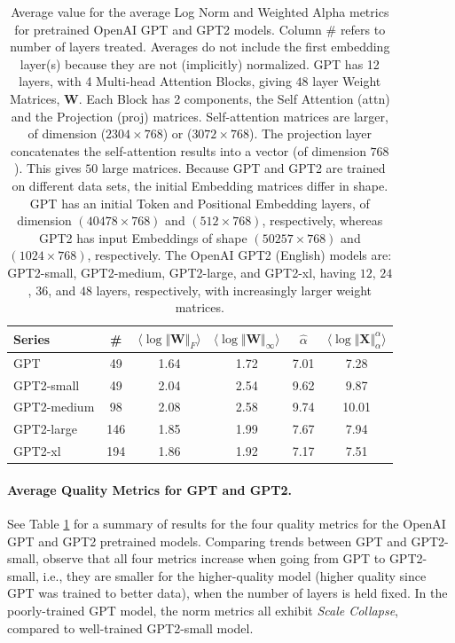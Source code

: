\begin{table}[t]
\small
\begin{center}
\begin{tabular}{|p{1in}|c|c|c|c|c|}
\hline
 Series  & \#   & $\langle\log\Vert\mathbf{W}\Vert_{F}\rangle$ & $\langle\log\Vert\mathbf{W}\Vert_{\infty}\rangle$ & $\hat{\alpha}$ & $\langle\log\Vert\mathbf{X}\Vert^{\alpha}_{\alpha}\rangle$ \\
\hline
GPT & 49 & 1.64  & 1.72 & 7.01 & 7.28 \\
GPT2-small & 49 & 2.04  & 2.54& 9.62 & 9.87 \\
\hline
GPT2-medium & 98 & 2.08 & 2.58& 9.74 & 10.01 \\
GPT2-large & 146 & 1.85 & 1.99& 7.67 & 7.94 \\
GPT2-xl & 194 & 1.86 & 1.92 & 7.17 & 7.51 \\
\hline
\end{tabular}
\end{center}
\caption{Average value for the average Log Norm and Weighted Alpha metrics for pretrained OpenAI GPT and GPT2 models. 
Column \# refers to number of layers treated.  
Averages do not include the first embedding layer(s) because they are not (implicitly) normalized.  
GPT has 12 layers, with 4 Multi-head Attention Blocks, giving $48$ layer Weight Matrices, $\mathbf{W}$.
Each Block has 2 components, the Self Attention (attn) and the Projection (proj) matrices.  
Self-attention  matrices are larger, of dimension ($2304\times 768$) or ($3072\times 768$).
The projection layer concatenates the self-attention results into a vector (of dimension $768$).
This gives $50$ large matrices.
Because GPT and GPT2 are trained on different data sets, the initial Embedding matrices differ in shape.
GPT has an initial Token and Positional Embedding layers, of dimension $(40478\times 768)$ and $(512\times 768)$, respectively, whereas GPT2 has input Embeddings of shape $(50257\times 768)$ and $(1024\times 768)$, respectively. 
The OpenAI GPT2 (English) models are: GPT2-small, GPT2-medium, GPT2-large, and GPT2-xl, having $12$, $24$, $36$, and $48$ layers, respectively, with increasingly larger weight matrices.
}
\label{table:nlp}
\end{table}


\paragraph{Average Quality Metrics for GPT and GPT2.}

See Table \ref{table:nlp} for a summary of results for the four quality metrics for the OpenAI GPT and GPT2 pretrained models.
Comparing trends between GPT and GPT2-small, 
observe that all four metrics increase when going from GPT to GPT2-small, i.e., they are smaller for the higher-quality model (higher quality since GPT was trained to better data), when the number of layers is held fixed.
In the poorly-trained GPT model, the norm metrics all exhibit \emph{Scale Collapse}, compared to well-trained GPT2-small model.

